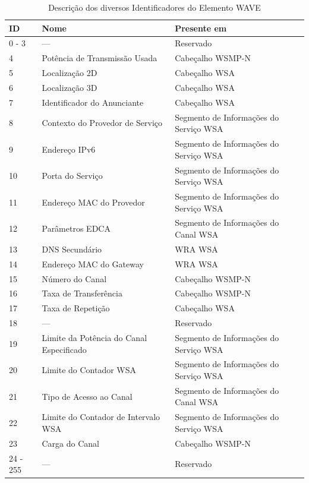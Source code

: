 \documentclass[
12pt,				%
openright,			%
oneside,			%
a4paper,			%
brazil,				%
]{abntex2}
\begin{document}
{\begin{anexosenv}
	    \begin{table}[H]
		    \renewcommand{\arraystretch}{1.5}
		    \begin{tabular}{|p{2.7cm}|p{7cm}|p{5cm}|} \hline	
			    \textbf{ID} & \textbf{Nome} & \textbf{Presente em} \\ \hline
			    0 - 3 & — &	Reservado \\ \hline
			    4 &	Potência de Transmissão Usada & Cabeçalho WSMP-N \\ \hline
			    5 &	Localização 2D & Cabeçalho WSA \\ \hline
			    6 & Localização 3D & Cabeçalho WSA \\ \hline
			    7 & Identificador do Anunciante & Cabeçalho WSA \\ \hline
			    8 &	Contexto do Provedor de Serviço & Segmento de Informações do Serviço WSA \\ \hline
			    9 & Endereço IPv6 & Segmento de Informações do Serviço WSA \\ \hline
			    10 & Porta do Serviço & Segmento de Informações do Serviço WSA \\ \hline
			    11 & Endereço MAC do Provedor &	Segmento de Informações do Serviço WSA \\ \hline
			    12 & Parâmetros EDCA & Segmento de Informações do Canal WSA \\ \hline
			    13 & DNS Secundário & WRA WSA \\ \hline
			    14 & Endereço MAC do Gateway & WRA WSA \\ \hline
			    15 & Número do Canal & Cabeçalho WSMP-N \\ \hline
			    16 & Taxa de Transferência & Cabeçalho WSMP-N \\ \hline
			    17 & Taxa de Repetição & Cabeçalho WSA \\ \hline
			    18 & — & Reservado \\ \hline
			    19 & Limite da Potência do Canal Especificado & Segmento de Informações do Serviço WSA \\ \hline
			    20 & Limite do Contador WSA & Segmento de Informações do Serviço WSA \\ \hline
			    21 & Tipo de Acesso ao Canal & Segmento de Informações do Canal WSA \\ \hline
			    22 & Limite do Contador de Intervalo WSA & Segmento de Informações do Serviço WSA \\ \hline
			    23 & Carga do Canal & Cabeçalho WSMP-N \\ \hline
			    24 - 255 &	— &	Reservado \\
			    \hline
		    \end{tabular}	
			    \caption{\label{tab_3}Descrição dos diversos Identificadores do Elemento WAVE}
	    \end{table}


\end{anexosenv}}
\end{document}
